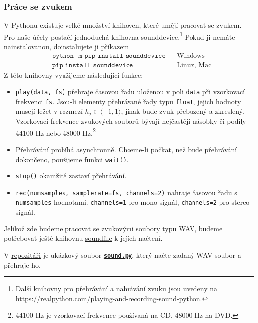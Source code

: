 \documentclass[a4paper,11pt,twoside]{article}
\def\code#1{\textnormal{\texttt{#1}}}
\def\ghfile#1#2{\textnormal{\textbf{\texttt{\href{https://github.com/PavelStransky/PCInPhysics2021/blob/main/#1#2}{#2}}}}}
\theoremstyle{red}
\theoremstyle{green}
\begin{document}
\subsubsection{Práce se zvukem}
\label{sec:Zvuk}
    V Pythonu existuje velké množství knihoven, které umějí pracovat se zvukem.
    Pro naše účely postačí jednoduchá knihovna \href{https://python-sounddevice.readthedocs.io}{sounddevice}.\footnote{
        Další knihovny pro přehrávání a nahrávání zvuku jsou uvedeny na \url{https://realpython.com/playing-and-recording-sound-python}.
    }
    Pokud ji nemáte nainstalovanou, doinstalujete ji příkazem
    \begin{align*}
        &\texttt{python -m pip install sounddevice}
        &&\text{Windows}\\
        &\texttt{pip install sounddevice}
        &&\text{Linux, Mac}
    \end{align*}
    Z této knihovny využijeme následující funkce:
    \begin{itemize}
        \item \code{play(data, fs)} 
            přehraje časovou řadu uloženou v poli \code{data} při vzorkovací frekvenci \code{fs}.
            Jsou-li elementy přehrávané řady typu \code{float}, jejich hodnoty musejí ležet v rozmezí $h_{j}\in\langle-1,1\rangle$, jinak bude zvuk přebuzený a zkreslený.
            Vzorkovací frekvence zvukových souborů bývají nejčastěji násobky či podíly 44100 Hz nebo 48000 Hz.\footnote{
                44100 Hz je vzorkovací frekvence používaná na CD, 48000 Hz na DVD.
            }
                            
        \item 
            Přehrávání probíhá asynchronně. 
            Chceme-li počkat, než bude přehrávání dokončeno, použijeme funkci \code{wait()}. 

        \item \code{stop()} okamžitě zastaví přehrávání.
        
        \item \code{rec(numsamples, samplerate=fs, channels=2)} nahraje časovou řadu s \code{numsamples} hodnotami. \code{channels=1} pro mono signál, \code{channels=2} pro stereo signál.
    \end{itemize}
    Jelikož zde budeme pracovat se zvukovými soubory typu WAV, budeme potřebovat ještě knihovnu \href{https://pysoundfile.readthedocs.io}{soundfile} k jejich načtení.

    V \href{https://github.com/PavelStransky/PCInPhysics}{repozitáři} je ukázkový soubor \ghfile{python/basics/}{sound.py}, který načte zadaný WAV soubor a přehraje ho. 
\end{document}
